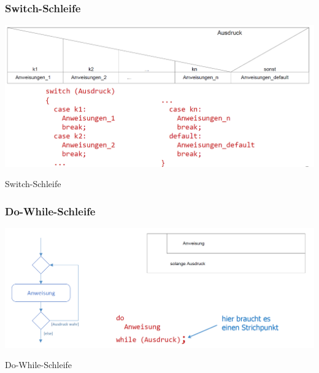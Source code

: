		\subsubsection{Switch-Schleife}
			\begin{minipage}{.45\linewidth}
				\includegraphics[width=0.95\linewidth]{Bilder/Switch.png}
			\end{minipage}
			\hfill
			\begin{minipage}{.5\linewidth}
				Switch-Schleife
			\end{minipage}

		\subsubsection{Do-While-Schleife}
			\begin{minipage}{.45\linewidth}
				\includegraphics[width=0.95\linewidth]{Bilder/dowhile.png}
			\end{minipage}
			\hfill
			\begin{minipage}{.5\linewidth}
				Do-While-Schleife
			\end{minipage}

